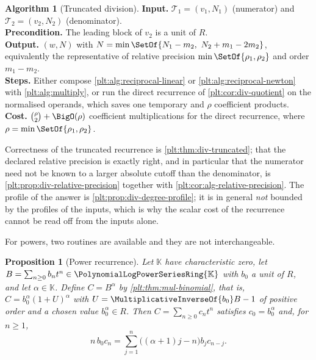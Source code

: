 \documentclass[11pt,oneside]{article}
\theoremstyle{plain}
\newtheorem{proposition}[theorem]{Proposition}
\theoremstyle{definition}
\newtheorem{algorithm}[theorem]{Algorithm}
\theoremstyle{remark}
\newcommand{\K}{\mathbb{K}}
\newcommand{\PLpow}{\PolynomialLogPowerSeriesRing{\K}}   %
\begin{document}
\begin{algorithm}[Truncated division]\label{plt:alg:divide}
\textbf{Input.}  \(\mathcal T_1=(v_1,N_1)\) (numerator) and
\(\mathcal T_2=(v_2,N_2)\) (denominator).\\
\textbf{Precondition.}  The leading block of \(v_2\) is a unit of \(R\).\\
\textbf{Output.}  \((w,N)\) with
\(N=\min\SetOf{N_1-m_2,\ N_2+m_1-2m_2}\), equivalently the representative of
relative precision \(\min\SetOf{\rho_1,\rho_2}\) and order \(m_1-m_2\).\\
\textbf{Steps.}  Either compose \cref{plt:alg:reciprocal-linear} or
\cref{plt:alg:reciprocal-newton} with \cref{plt:alg:multiply}, or run the direct
recurrence of \cref{plt:cor:div-quotient} on the normalised operands, which
saves one temporary and \(\rho\) coefficient products.\\
\textbf{Cost.}  \(\binom{\rho}{2}+\BigO(\rho)\) coefficient multiplications for
the direct recurrence, where \(\rho=\min\SetOf{\rho_1,\rho_2}\).
\end{algorithm}

Correctness of the truncated recurrence is \cref{plt:thm:div-truncated}; that
the declared relative precision is exactly right, and in particular that the
numerator need not be known to a larger absolute cutoff than the denominator,
is \cref{plt:prop:div-relative-precision} together with
\cref{plt:cor:alg-relative-precision}.  The profile of the answer is
\cref{plt:prop:div-degree-profile}; it is in general \emph{not} bounded by the
profiles of the inputs, which is why the scalar cost of the recurrence cannot
be read off from the inputs alone.

For powers, two routines are available and they are not interchangeable.

\begin{proposition}[Power recurrence]\label{plt:prop:alg-power-recurrence}
Let \(\K\) have characteristic zero, let \(B=\sum_{n\ge0}b_nt^n\in\PLpow\) with
\(b_0\) a unit of \(R\), and let \(\alpha\in\K\).  Define \(C=B^{\alpha}\)
by \cref{plt:thm:mul-binomial}, that is,
\(C=b_0^{\alpha}(1+U)^{\alpha}\) with \(U=\MultiplicativeInverseOf{b_0}B-1\) of
positive order and a chosen value \(b_0^{\alpha}\in R\).  Then
\(C=\sum_{n\ge0}c_nt^n\) satisfies \(c_0=b_0^{\alpha}\) and, for \(n\ge1\),
\begin{equation}\label{plt:eq:alg-power-recurrence}
 n\,b_0c_n=\sum_{j=1}^{n}\bigl((\alpha+1)j-n\bigr)b_jc_{n-j}.
\end{equation}
\end{proposition}
\end{document}

